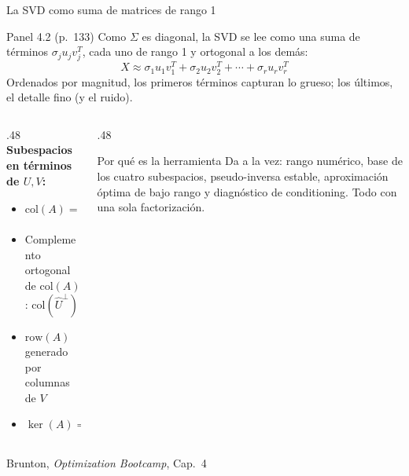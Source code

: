 \documentclass[10pt,aspectratio=169]{beamer}
\newcommand{\fuente}{\vfill{\scriptsize\color{gray}Brunton, \emph{Optimization Bootcamp}, Cap.~4}}
\newcommand{\col}{\mathrm{col}}
\begin{document}
\begin{frame}{La SVD como suma de matrices de rango 1}
  \small
  \begin{block}{Panel 4.2 (p.~133)}
    Como $\Sigma$ es diagonal, la SVD se lee como una suma de términos
    $\sigma_j u_j v_j^T$, cada uno de rango 1 y ortogonal a los demás:
    \[
      X \approx \sigma_1 u_1 v_1^T + \sigma_2 u_2 v_2^T
             + \cdots + \sigma_r u_r v_r^T
    \]
    Ordenados por magnitud, los primeros términos capturan lo grueso;
    los últimos, el detalle fino (y el ruido).
  \end{block}

  \vspace{1mm}
  \begin{columns}[T,onlytextwidth]
    \begin{column}{.48\textwidth}
      \textbf{Subespacios en términos de $U,V$:}
      \begin{itemize}
        \item $\col(A) = \col(\hat{U})$
        \item Complemento ortogonal de $\col(A)$: $\col(\hat{U}^\perp)$
        \item $\mathrm{row}(A)$ generado por columnas de $V$
        \item $\ker(A) = \col(V^\perp)$
      \end{itemize}
    \end{column}
    \begin{column}{.48\textwidth}
      \begin{block}{Por qué es la herramienta}
        \scriptsize
        Da a la vez: rango numérico, base de los cuatro subespacios,
        pseudo-inversa estable, aproximación óptima de bajo rango y
        diagnóstico de conditioning. Todo con una sola factorización.
      \end{block}
    \end{column}
  \end{columns}
  \fuente
\end{frame}
\end{document}

